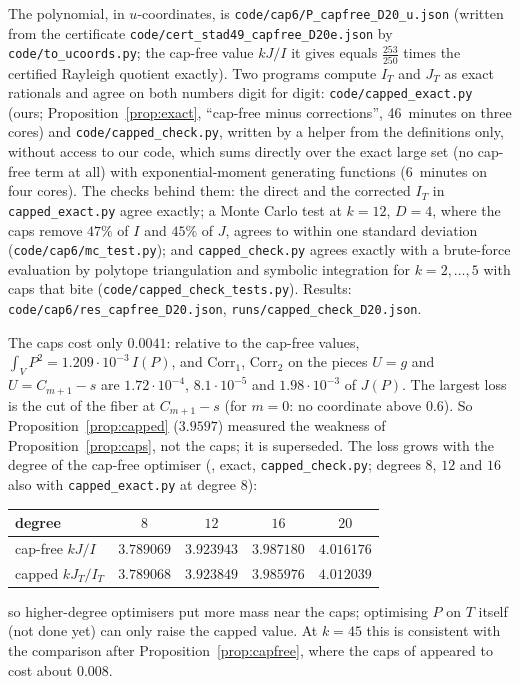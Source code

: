 \begin{sloppypar}
The polynomial, in $u$-coordinates, is \texttt{code/cap6/P\_capfree\_D20\_u.json}
(written from the certificate \texttt{code/cert\_stad49\_capfree\_D20e.json} by
\texttt{code/to\_ucoords.py}; the cap-free value $kJ/I$ it gives equals
$\frac{253}{250}$ times the certified Rayleigh quotient exactly). Two programs
compute $I_T$ and $J_T$ as exact rationals and agree on both numbers digit for
digit: \texttt{code/capped\_exact.py} (ours; Proposition~\ref{prop:exact},
``cap-free minus corrections'', 46~minutes on three cores) and
\texttt{code/capped\_check.py}, written by a helper from the definitions only,
without access to our code, which sums directly over the exact large set
(no cap-free term at all) with exponential-moment generating functions
($6$~minutes on four cores). The checks behind them: the direct and the
corrected $I_T$ in \texttt{capped\_exact.py} agree exactly; a Monte Carlo
test at $k=12$, $D=4$, where the caps remove $47\%$ of $I$ and $45\%$ of $J$,
agrees to within one standard deviation
(\texttt{code/cap6/mc\_test.py}); and \texttt{capped\_check.py} agrees exactly
with a brute-force evaluation by polytope triangulation and symbolic
integration for $k=2,\dots,5$ with caps that bite
(\texttt{code/capped\_check\_tests.py}). Results:
\texttt{code/cap6/res\_capfree\_D20.json}, \texttt{runs/capped\_check\_D20.json}.
\end{sloppypar}

The caps cost only $0.0041$: relative to the cap-free values,
$\int_VP^2=1.209\cdot10^{-3}\,I(P)$, and $\mathrm{Corr}_1$,
$\mathrm{Corr}_2$ on the pieces $U=g$ and $U=C_{m+1}-s$ are
$1.72\cdot10^{-4}$, $8.1\cdot10^{-5}$ and $1.98\cdot10^{-3}$ of $J(P)$. The
largest loss is the cut of the fiber at $C_{m+1}-s$ (for $m=0$: no coordinate
above $0.6$). So Proposition~\ref{prop:capped} ($3.9597$) measured the
weakness of Proposition~\ref{prop:caps}, not the caps; it is superseded. The loss grows with the degree of the cap-free optimiser
(, exact, \texttt{capped\_check.py}; degrees $8$, $12$ and $16$
also with \texttt{capped\_exact.py} at degree $8$):
\begin{center}
\begin{tabular}{@{}lcccc@{}}
\toprule
degree & $8$ & $12$ & $16$ & $20$\\
\midrule
cap-free $kJ/I$ & $3.789069$ & $3.923943$ & $3.987180$ & $4.016176$\\
capped $kJ_T/I_T$ & $3.789068$ & $3.923849$ & $3.985976$ & $4.012039$\\
\bottomrule
\end{tabular}
\end{center}
so higher-degree optimisers put more mass near the caps; optimising $P$ on
$T$ itself (not done yet) can only raise the capped value.
At $k=45$ this is consistent with the comparison after
Proposition~\ref{prop:capfree}, where the caps of \cite{Cha26} appeared to
cost about $0.008$.

